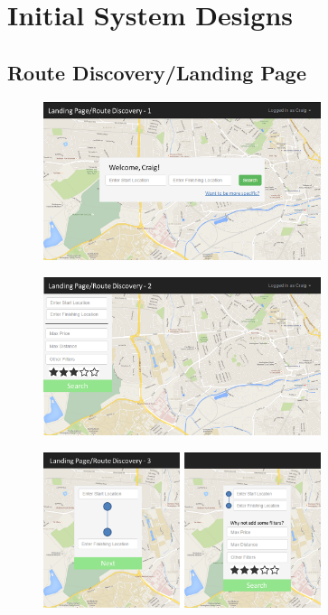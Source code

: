 \section{Initial System Designs}
\label{sec:isd}
\subsection{Route Discovery/Landing Page}
\begin{figure}[!ht]
	\begin{center}
		\includegraphics[width=0.725\textwidth]{images/appendix/landing1.png}
	\end{center}
	\vspace{-6mm}
\end{figure}

\begin{figure}[!ht]
	\begin{center}
		\includegraphics[width=0.725\textwidth]{images/appendix/landing2.png}
	\end{center}
	\vspace{-6mm}
\end{figure}

\begin{figure}[!ht]
	\begin{center}
		\includegraphics[width=0.725\textwidth]{images/appendix/landing3.png}
	\end{center}
	\vspace{-6mm}
\end{figure}

